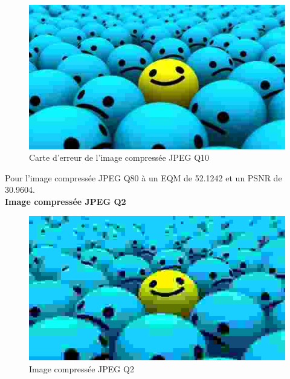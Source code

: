 \documentclass[12pt]{report}
\begin{document}
\begin{figure}[H]
\begin{center}
\includegraphics[scale=0.5]{../smileyDegQ10.jpg} 
\caption{Carte d'erreur de l'image compressée JPEG Q10 }
\end{center}
\end{figure}

Pour l'image compressée JPEG Q80 à un EQM de 52.1242 et un PSNR de 30.9604.\\

\textbf{Image compressée JPEG Q2}

\begin{figure}[H]
\begin{center}
\includegraphics[scale=0.5]{../smileyDegQ2.jpg} 
\caption{Image compressée JPEG Q2 }
\end{center}
\end{figure}
\end{document}
